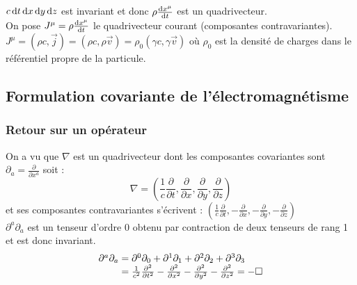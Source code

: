 \begin{corol}
	{\txt $c\,\mathrm{d} t\,\mathrm{d} x\,\mathrm{d} y\,\mathrm{d} z$ est invariant et donc $\rho\frac{\mathrm{d} x^\mu}{\mathrm{d} t}$ est un quadrivecteur.}\\
	On pose $J^\mu=\rho\frac{\mathrm{d} x^\mu}{\mathrm{d} t}$ le quadrivecteur courant (composantes contravariantes).\\
	$J^\mu=(\rho c,\vec{j})=(\rho c,\rho \vec{v})=\rho_0(\gamma c,\gamma\vec{v})$ où $\rho_0$ est la densité de charges dans le référentiel propre de la particule.
\end{corol}

\subsection{Formulation covariante de l'électromagnétisme}
\subsubsection{Retour sur un opérateur}

On a vu que $\nabla$ est un quadrivecteur dont les composantes covariantes sont $\partial_a=\frac{\partial}{\partial{x^a}}$ soit :
$$ 
	\nabla=\left(\frac{1}{c}\frac{\partial}{\partial t},\frac{\partial}{\partial x},\frac{\partial}{\partial y},\frac{\partial}{\partial z}\right)
$$
et ses composantes contravariantes s'écrivent : $\left(\frac{1}{c}\frac{\partial}{\partial t},-\frac{\partial}{\partial x},-\frac{\partial}{\partial y},-\frac{\partial}{\partial z}\right)$\\
$\partial^a\partial_a$ est un tenseur d'ordre 0 obtenu par contraction de deux tenseurs de rang 1 et est donc invariant.
$$
	\begin{array}{r@{\;}l}
			\partial^a\partial_a&=\partial^0\partial_0+\partial^1\partial_1+\partial^2\partial_2+\partial^3\partial_3\\
		&=\frac{1}{c^2}\frac{\partial^2}{\partial t^2}-\frac{\partial^2}{\partial x^2}-\frac{\partial^2}{\partial y^2}-\frac{\partial^2}{\partial z^2} = -\square
	\end{array}	
$$

